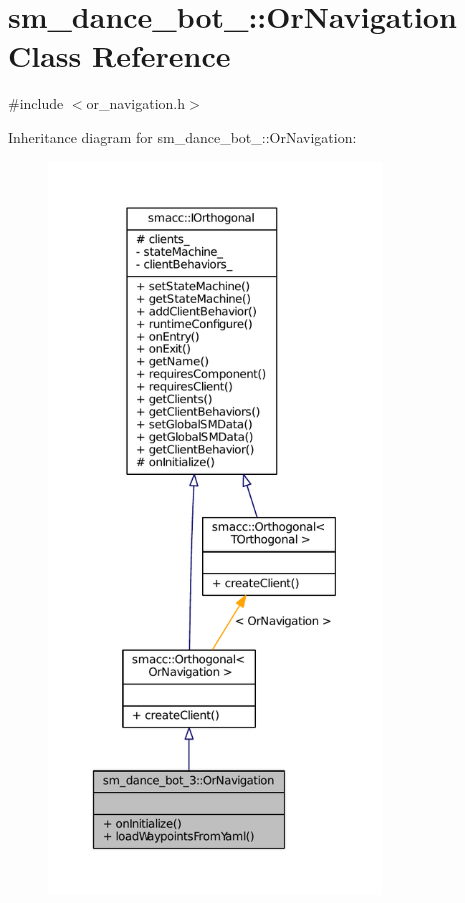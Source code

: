 \hypertarget{classsm__dance__bot__3_1_1OrNavigation}{}\section{sm\+\_\+dance\+\_\+bot\+\_\+:\+:Or\+Navigation Class Reference}
\label{classsm__dance__bot__3_1_1OrNavigation}


{\ttfamily \#include $<$or\+\_\+navigation.\+h$>$}



Inheritance diagram for sm\+\_\+dance\+\_\+bot\+\_\+:\+:Or\+Navigation\+:
\nopagebreak
\begin{figure}[H]
\begin{center}
\leavevmode
\includegraphics[height=550pt]{classsm__dance__bot__3_1_1OrNavigation__inherit__graph}
\end{center}
\end{figure}


